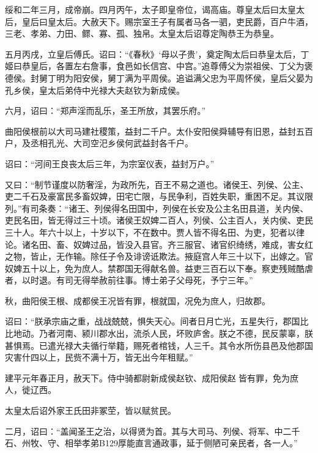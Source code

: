 \documentclass[12pt,UTF8]{ctexbook}
\begin{document}
绥和二年三月，成帝崩。四月丙午，太子即皇帝位，谒高庙。尊皇太后曰太皇太后，皇后曰皇太后。大赦天下。赐宗室王子有属者马各一驷，吏民爵，百户牛酒，三老、孝弟、力田、鳏、寡、孤、独帛。太皇太后诏尊定陶恭王为恭皇。



五月丙戌，立皇后傅氏。诏曰：“《春秋》‘母以子贵’，奠定陶太后曰恭皇太后，丁姬曰恭皇后，各置左右詹事，食邑如长信宫、中宫。”追尊傅父为崇祖侯、丁父为褒德侯。封舅丁明为阳安侯，舅丁满为平周侯。追谥满父忠为平周怀侯，皇后父晏为孔乡侯，皇太后弟侍中光禄大夫赵钦为新成侯。



六月，诏曰：“郑声淫而乱乐，圣王所放，其罢乐府。”



曲阳侯根前以大司马建社稷策，益封二千户。太仆安阳侯舜辅导有旧恩，益封五百户，及丞相孔光、大司空汜乡侯何武益封各千户。



诏曰：“河间王良丧太后三年，为宗室仪表，益封万户。”



又曰：“制节谨度以防奢淫，为政所先，百王不易之道也。诸侯王、列侯、公主、吏二千石及豪富民多畜奴婢，田宅亡限，与民争利，百姓失职，重困不足。其议限列。”有司条奏：“诸王、列侯得名田国中，列侯在长安及公主名田县道，关内侯、吏民名田，皆无得过三十顷。诸侯王奴婢二百人，列侯、公主百人，关内侯、吏民三十人。年六十以上，十岁以下，不在数中。贾人皆不得名田、为吏，犯者以律论。诸名田、畜、奴婢过品，皆没入县官。齐三服官、诸官织绮绣，难成，害女红之物，皆止，无作输。除任子令及诽谤诋欺法。掖庭宫人年三十以下，出嫁之。官奴婢五十以上，免为庶人。禁郡国无得献名兽。益吏三百石以下奉。察吏残贼酷虐者，以时退。有司无得举赦前往事。博士弟子父母死，予宁三年。”



秋，曲阳侯王根、成都侯王况皆有罪，根就国，况免为庶人，归故郡。



诏曰：“朕承宗庙之重，战战兢兢，惧失天心。间者日月亡光，五星失行，郡国比比地动。乃者河南、颍川郡水出，流杀人民，坏败庐舍。朕之不德，民反蒙辜，朕甚惧焉。已遣光禄大夫循行举籍，赐死者棺钱，人三千。其令水所伤县邑及他郡国灾害什四以上，民赀不满十万，皆无出今年租赋。”



建平元年春正月，赦天下。侍中骑都尉新成侯赵钦、成阳侯赵皆有罪，免为庶人，徙辽西。



太皇太后诏外家王氏田非冢茔，皆以赋贫民。



二月，诏曰：“盖闻圣王之治，以得贤为首。其与大司马、列侯、将军、中二千石、州牧、守、相举孝弟B129厚能直言通政事，延于侧陋可亲民者，各一人。”
\end{document}
